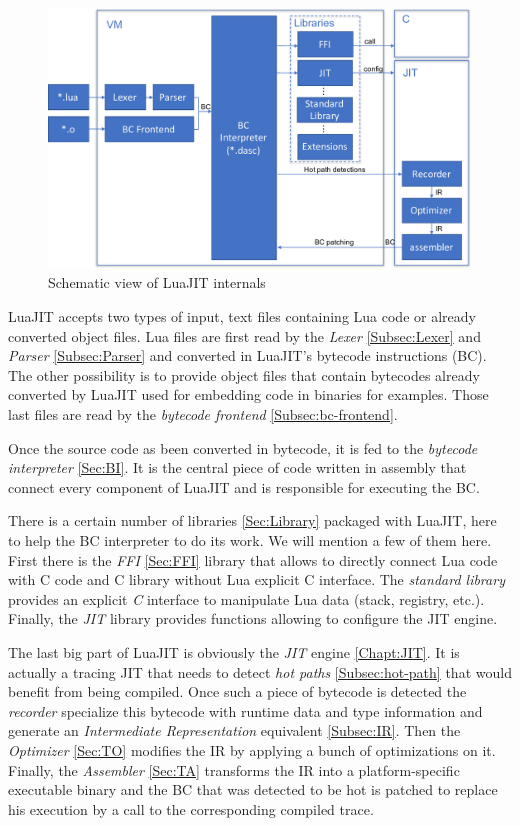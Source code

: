 \begin{figure}[H]
    \centering
	\includegraphics[width=\textwidth]{./Images/LuaJIT.pdf}
    \caption{Schematic view of LuaJIT internals}
    \label{fig:luajit-internal}
\end{figure}{}

LuaJIT accepts two types of input,
text files containing Lua code or already converted object files. Lua files are
first read by the \emph{Lexer} \ref{Subsec:Lexer} and \emph{Parser} \ref{Subsec:Parser} and
converted in LuaJIT's bytecode instructions (BC). The other possibility is to provide
object files that contain bytecodes already converted by LuaJIT used for
embedding code in binaries for examples. Those last files are read by the
\emph{bytecode frontend} \ref{Subsec:bc-frontend}.

Once the source code as been converted in bytecode, it is fed to the \emph{bytecode
interpreter} \ref{Sec:BI}. It is the central piece of code written in assembly
that connect every component of LuaJIT and is responsible for executing the BC.

There is a certain number of libraries \ref{Sec:Library} packaged with LuaJIT, here
to help the BC interpreter to do its work. We will mention a few of them here.
First there is the \emph{FFI} \ref{Sec:FFI} library that allows to directly connect Lua
code with C code and C library without Lua explicit C interface. The \emph{standard
library} provides an explicit \emph{C} interface to manipulate Lua data
(stack, registry, etc.). Finally, the \emph{JIT} library provides functions
allowing to configure the JIT engine.

The last big part of LuaJIT is obviously the \emph{JIT} engine \ref{Chapt:JIT}.
It is actually a tracing JIT that needs to detect \emph{hot paths}
\ref{Subsec:hot-path} that would benefit from being compiled. Once such a piece
of bytecode is detected the \emph{recorder} specialize this bytecode with runtime
data and type information and generate an \emph{Intermediate Representation}
equivalent \ref{Subsec:IR}. Then the \emph{Optimizer} \ref{Sec:TO} modifies the IR by
applying a bunch of optimizations on it. Finally, the \emph{Assembler} \ref{Sec:TA}
transforms the IR into a platform-specific executable binary and the BC that was
detected to be hot is patched to replace his execution by a call to the
corresponding compiled trace.
